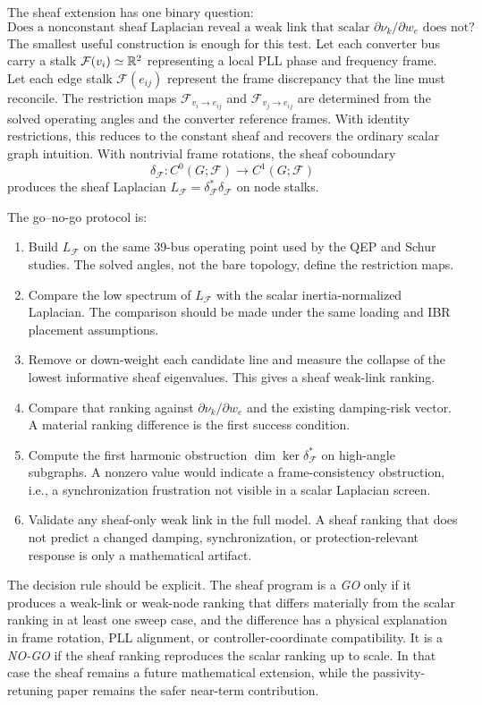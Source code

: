 The sheaf extension has one binary question:
\[
\text{Does a nonconstant sheaf Laplacian reveal a weak link that scalar }
\partial\nu_k/\partial w_e\text{ does not?}
\]
The smallest useful construction is enough for this test. Let each converter bus
carry a stalk \(\mathcal F(v_i)\simeq\mathbb{R}^2\) representing a local PLL phase and
frequency frame. Let each edge stalk \(\mathcal F(e_{ij})\) represent the frame
discrepancy that the line must reconcile. The restriction maps
\(\mathcal F_{v_i\to e_{ij}}\) and \(\mathcal F_{v_j\to e_{ij}}\) are determined
from the solved operating angles and the converter reference frames. With
identity restrictions, this reduces to the constant sheaf and recovers the
ordinary scalar graph intuition. With nontrivial frame rotations, the sheaf
coboundary
\[
  \delta_{\mathcal F}: C^0(G;\mathcal F)\to C^1(G;\mathcal F)
\]
produces the sheaf Laplacian \(L_{\mathcal F}=\delta_{\mathcal F}^\ast
\delta_{\mathcal F}\) on node stalks.

The go--no-go protocol is:
\begin{enumerate}
\item Build \(L_{\mathcal F}\) on the same 39-bus operating point used by the
QEP and Schur studies. The solved angles, not the bare topology, define the
restriction maps.
\item Compare the low spectrum of \(L_{\mathcal F}\) with the scalar
inertia-normalized Laplacian. The comparison should be made under the same
loading and IBR placement assumptions.
\item Remove or down-weight each candidate line and measure the collapse of the
lowest informative sheaf eigenvalues. This gives a sheaf weak-link ranking.
\item Compare that ranking against \(\partial\nu_k/\partial w_e\) and the
existing damping-risk vector. A material ranking difference is the first success
condition.
\item Compute the first harmonic obstruction
\(\dim\ker\delta_{\mathcal F}^\ast\) on high-angle subgraphs. A nonzero value
would indicate a frame-consistency obstruction, i.e., a synchronization
frustration not visible in a scalar Laplacian screen.
\item Validate any sheaf-only weak link in the full model. A sheaf ranking that
does not predict a changed damping, synchronization, or protection-relevant
response is only a mathematical artifact.
\end{enumerate}

The decision rule should be explicit. The sheaf program is a \emph{GO} only if
it produces a weak-link or weak-node ranking that differs materially from the
scalar ranking in at least one sweep case, and the difference has a physical
explanation in frame rotation, PLL alignment, or controller-coordinate
compatibility. It is a \emph{NO-GO} if the sheaf ranking reproduces the scalar
ranking up to scale. In that case the sheaf remains a future mathematical
extension, while the passivity-retuning paper remains the safer near-term
contribution.

